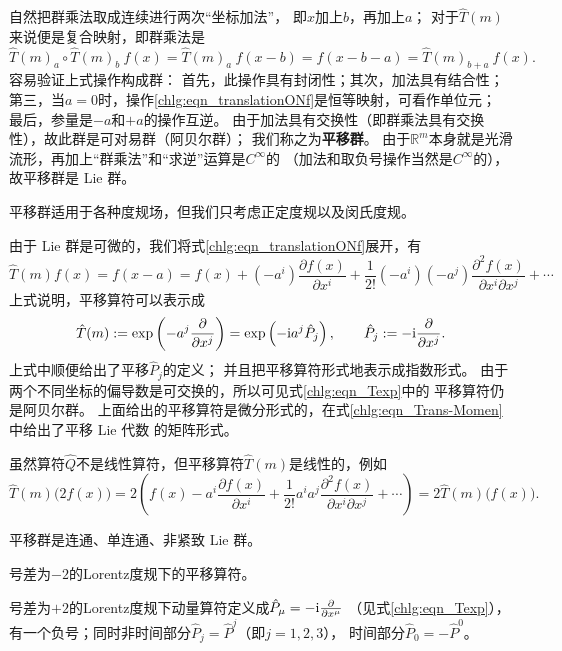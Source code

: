 自然把群乘法取成连续进行两次“坐标加法”，
即$x$加上$b$，再加上$a$；
对于$\hat{T}(m)$来说便是复合映射，即群乘法是
\begin{equation*}
    \hat{T}(m)_{a}\circ \hat{T}(m)_{b}\ f(x)
    = \hat{T}(m)_{a}\ f(x - b)
    = f(x - b - a)
    = \hat{T}(m)_{b+ a}\ f(x) .
\end{equation*}
容易验证上式操作构成群：
首先，此操作具有封闭性；其次，加法具有结合性；
第三，当$a=0$时，操作\eqref{chlg:eqn_translationONf}是恒等映射，可看作单位元；
最后，参量是$-a$和$+a$的操作互逆。
由于加法具有交换性（即群乘法具有交换性），故此群是可对易群（阿贝尔群）；
我们称之为\textbf{平移群}。
由于$\mathbb{R}^m$本身就是光滑流形，再加上“群乘法”和“求逆”运算是$C^\infty$的
（加法和取负号操作当然是$C^\infty$的），故平移群是 Lie 群。

平移群适用于各种度规场，但我们只考虑正定度规以及闵氏度规。

由于 Lie 群是可微的，我们将式\eqref{chlg:eqn_translationONf}展开，有
\begin{equation*}
    \hat{T}(m) f(x) = f(x - a)
    = f(x) + (-a^i) \frac{\partial f(x)}{\partial x^i}
    +\frac{1}{2!} (-a^i)(-a^j) \frac{\partial^2 f(x)}{\partial x^i \partial x^j}
    +\cdots
\end{equation*}
上式说明，平移算符可以表示成
\begin{equation}\label{chlg:eqn_Texp}
    \hat{T}(m) := \exp\left( -a^j \frac{\partial }{\partial x^j} \right)
    =\exp\left(-\mathrm{i} a^j \hat{P}_j  \right) , \qquad
    \hat{P}_j:= -\mathrm{i} \frac{\partial }{\partial x^j} .
\end{equation}
上式中顺便给出了平移$\hat{P}_j$的定义；
并且把平移算符形式地表示成指数形式。
由于两个不同坐标的偏导数是可交换的，所以可见式\eqref{chlg:eqn_Texp}中的
平移算符仍是阿贝尔群。
上面给出的平移算符是微分形式的，在式\eqref{chlg:eqn_Trans-Momen}中给出了平移 Lie 代数
的矩阵形式。

虽然算符$\hat{Q}$不是线性算符，但平移算符$\hat{T}(m)$是线性的，例如
\begin{equation*}
    \hat{T}(m) \bigl(2f(x)\bigr)
    =2\left( f(x) - a^i \frac{\partial f(x)}{\partial x^i}
    +\frac{1}{2!} a^i a^j \frac{\partial^2 f(x)}{\partial x^i \partial x^j}
    +\cdots \right) = 2 \hat{T}(m) \bigl(f(x)\bigr)  .
\end{equation*}

平移群是连通、单连通、非紧致 Lie 群。

\begin{example}
    号差为$-2$的Lorentz度规下的平移算符。
\end{example}
号差为$+2$的Lorentz度规下动量算符定义成$\hat{P}_\mu =- \mathrm{i} \frac{\partial }{\partial x^\mu}$
（见式\eqref{chlg:eqn_Texp}），有一个负号；同时非时间部分$\hat{P}_j =\hat{P}^j$（即$j=1,2,3$），
时间部分$\hat{P}_0 =-\hat{P}^0$。

